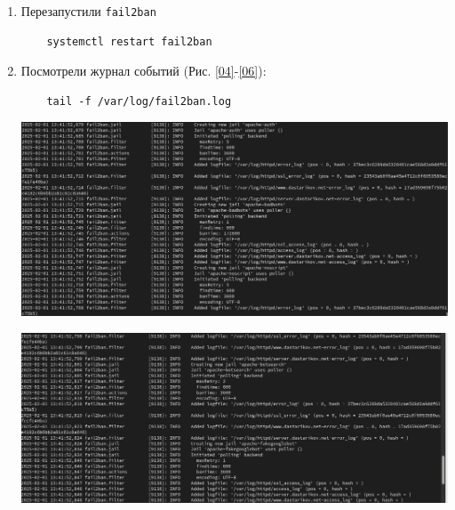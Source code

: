 \begin{enumerate}
\begin{verbatim}
    [apache-botsearch]
    enabled = true

    [apache-fakegooglebot]
    enabled = true

    [apache-modsecurity]
    enabled = true

    [apache-shellshock]
    enabled = true
\end{verbatim}

\item Перезапустили {\tt fail2ban}
\begin{verbatim}
    systemctl restart fail2ban
\end{verbatim}

\item Посмотрели журнал событий (Рис. \ref{04}-\ref{06}):
\begin{verbatim}
    tail -f /var/log/fail2ban.log
\end{verbatim}

  \begin{center}
    \centering
    \includegraphics[width=\textwidth]{../images/image04.png}
    \label{04}
  \end{center}

  \begin{center}
    \centering
    \includegraphics[width=\textwidth]{../images/image05.png}
    \label{05}
  \end{center}


\end{enumerate}

